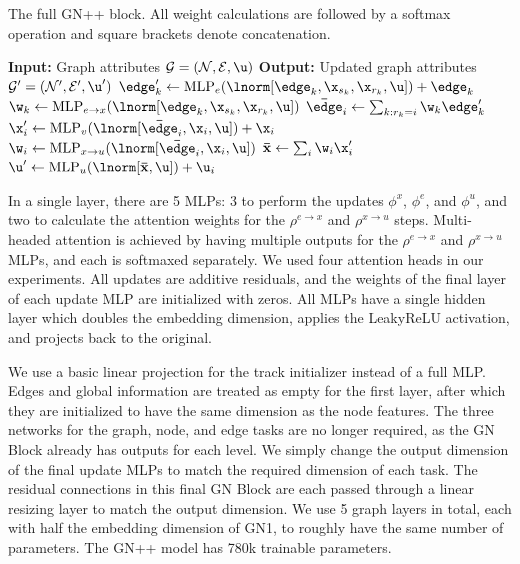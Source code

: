 \begin{algorithm}[h!]
    \caption{The full GN++ block. All weight calculations are followed by a softmax operation and square brackets denote concatenation.}
    \label{alg:gnpp}
    \begin{algorithmic}[1]
        \State \textbf{Input:} Graph attributes $\mathcal{G} = (\mathcal{N}, \mathcal{E}, \u)$
        \State \textbf{Output:} Updated graph attributes $\mathcal{G}' = (\mathcal{N}', \mathcal{E}', \u')$
            \State $\edge_k' \gets \text{MLP}_e(\lnorm[\edge_k, \x_{s_k}, \x_{r_k}, \u]) + \edge_k$ 
            \State $\w_k \gets \text{MLP}_{e \to x}(\lnorm[\edge_k, \x_{s_k}, \x_{r_k}, \u])$ 
        \EndFor
            \State $\mathbf{\bar\edge}_i \gets \sum_{k: r_k = i} \w_k \edge_k'$ 
            \State $\x_i' \gets \text{MLP}_v(\lnorm[\mathbf{\bar\edge}_i, \x_i, \u]) + \x_i$ 
            \State $\w_i \gets \text{MLP}_{x \to u}(\lnorm[\mathbf{\bar\edge}_i, \x_i, \u])$ 
        \EndFor
        \State $\mathbf{\bar{x}} \gets \sum_{i} \w_i \x_i'$ 
        \State $\u' \gets \text{MLP}_u(\lnorm[\mathbf{\bar{x}}, \u]) + \u_i$ 
    \end{algorithmic}
\end{algorithm}

In a single layer, there are 5 MLPs: 3 to perform the updates $\phi^x$, $\phi^e$, and $\phi^u$, and two to calculate the attention weights for the $\rho^{e \to x}$ and $\rho^{x \to u}$ steps.
Multi-headed attention is achieved by having multiple outputs for the $\rho^{e \to x}$ and $\rho^{x \to u}$ MLPs, and each is softmaxed separately.
We used four attention heads in our experiments.
All updates are additive residuals, and the weights of the final layer of each update MLP are initialized with zeros.
All MLPs have a single hidden layer which doubles the embedding dimension, applies the LeakyReLU activation, and projects back to the original.

We use a basic linear projection for the track initializer instead of a full MLP\@.
Edges and global information are treated as empty for the first layer, after which they are initialized to have the same dimension as the node features.
The three networks for the graph, node, and edge tasks are no longer required, as the GN Block already has outputs for each level.
We simply change the output dimension of the final update MLPs to match the required dimension of each task.
The residual connections in this final GN Block are each passed through a linear resizing layer to match the output dimension.
We use 5 graph layers in total, each with half the embedding dimension of GN1, to roughly have the same number of parameters.
The GN++ model has 780k trainable parameters.

